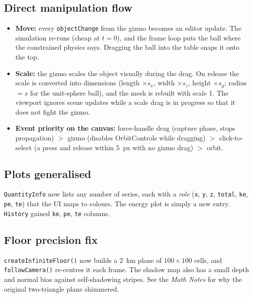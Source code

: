 \documentclass[11pt]{article}
\begin{document}
\subsection{Direct manipulation flow}
\begin{itemize}
  \item \textbf{Move:} every \texttt{objectChange} from the gizmo becomes an editor update. The simulation re-runs (cheap
        at $t=0$), and the frame loop puts the ball where the constrained physics says. Dragging the ball into the table
        snaps it onto the top.
  \item \textbf{Scale:} the gizmo scales the object visually during the drag. On release the scale is converted into
        dimensions (length $\times s_x$, width $\times s_z$, height $\times s_y$; radius $= s$ for the unit-sphere ball),
        and the mesh is rebuilt with scale 1. The viewport ignores scene updates while a scale drag is in progress so
        that it does not fight the gizmo.
  \item \textbf{Event priority on the canvas:} force-handle drag (capture phase, stops propagation) $>$ gizmo
        (disables OrbitControls while dragging) $>$ click-to-select (a press and release within \SI{5}{px} with no
        gizmo drag) $>$ orbit.
\end{itemize}

\subsection{Plots generalised}
\texttt{QuantityInfo} now lists any number of series, each with a \emph{role} (\texttt{x}, \texttt{y}, \texttt{z},
\texttt{total}, \texttt{ke}, \texttt{pe}, \texttt{te}) that the UI maps to colours. The energy plot is simply a new
entry. \texttt{History} gained \texttt{ke}, \texttt{pe}, \texttt{te} columns.

\subsection{Floor precision fix}
\texttt{createInfiniteFloor()} now builds a \SI{2}{km} plane of $100\times100$ cells, and \texttt{followCamera()} re-centres it
each frame. The shadow map also has a small depth and normal bias against self-shadowing stripes. See the
\emph{Math Notes} for why the original two-triangle plane shimmered.
\end{document}
